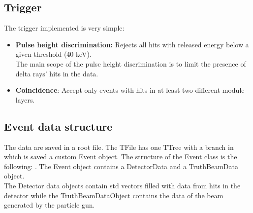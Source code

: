 \documentclass[10pt, a4paper, twocolumn]{article} %
\begin{document}
\subsection{Trigger}
The trigger implemented is very simple:
\begin{itemize}
    \item \textbf{Pulse height discrimination:} Rejects all hits with released energy below a given threshold (40 keV).
    \\
    The main scope of the pulse height discrimination is to limit the presence of delta rays' hits in the data.
    \item \textbf{Coincidence}: Accept only events with hits in at least two different module layers.
\end{itemize}

\subsection{Event data structure}
The data are saved in a root file. The TFile has one TTree with a branch in which is saved a custom Event object.
The structure of the Event class is the following:
.
\newline
The Event object contains a DetectorData and a TruthBeamData object.\\
The Detector data objects contain std vectors filled with data from hits in the detector while the TruthBeamDataObject contains the data of the beam generated by the particle gun.
\end{document}
